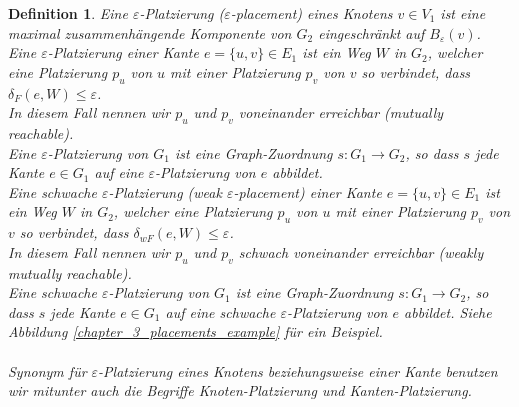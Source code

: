 \documentclass[a4paper, 12pt, twoside]{article}
\theoremstyle{Format1} %
\newtheorem{Def}{Definition}[section]       %
\begin{document}
\begin{Def}
	Eine \textit{$\varepsilon$-Platzierung ($\varepsilon$-placement) eines Knotens $v \in V_1$} ist eine maximal zusammenhängende Komponente von $G_2$ eingeschränkt auf $B_{\varepsilon}(v)$.
	Eine \textit{$\varepsilon$-Platzierung einer Kante $e = \{u,v\} \in E_1$} ist ein Weg $W$ in $G_2$, welcher eine Platzierung $p_u$ von $u$ mit einer Platzierung $p_v$ von $v$
	so verbindet, dass $\delta_F(e, W) \leq \varepsilon$.
	\\
	In diesem Fall nennen wir $p_u$ und $p_v$ \textit{voneinander erreichbar (mutually reachable)}.
	\\
	Eine \textit{$\varepsilon$-Platzierung von $G_1$} ist eine Graph-Zuordnung $s: G_1 \to G_2$, so dass $s$ jede Kante $e \in G_1$ auf eine $\varepsilon$-Platzierung von $e$ abbildet.
	\\
	Eine \textit{schwache $\varepsilon$-Platzierung (weak $\varepsilon$-placement) einer Kante $e = \{u,v\} \in E_1$} ist ein Weg $W$ in $G_2$, welcher eine Platzierung $p_u$ von $u$ mit einer Platzierung $p_v$ von $v$
	so verbindet, dass $\delta_{wF}(e, W) \leq \varepsilon$.
	\\
	In diesem Fall nennen wir $p_u$ und $p_v$ \textit{schwach voneinander erreichbar (weakly mutually reachable)}.
	\\
	Eine schwache \textit{$\varepsilon$-Platzierung von $G_1$} ist eine Graph-Zuordnung $s: G_1 \to G_2$, so dass $s$ jede Kante $e \in G_1$ auf eine schwache $\varepsilon$-Platzierung von $e$ abbildet.
	Siehe Abbildung \ref{chapter_3_placements_example} für ein Beispiel.
	\\
	\\
	Synonym für $\varepsilon$-Platzierung eines Knotens beziehungsweise einer Kante benutzen wir mitunter auch die Begriffe \textit{Knoten-Platzierung} und \textit{Kanten-Platzierung}.


\end{Def}
\end{document}
